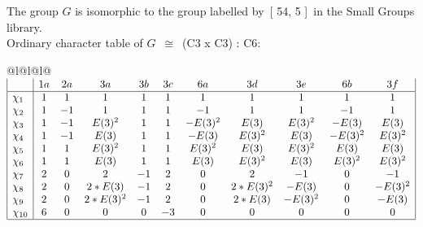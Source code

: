 \documentclass[varwidth=\maxdimen,border=10]{standalone}
\begin{document}
The group $G$ is isomorphic to the group labelled by\ [ 54, 5 ]\ in the Small Groups library.\\
Ordinary character table of $G$\ $\cong$\ (C3 x C3) : C6:\\
\begin{center}
\begin{tabular}{@{}l@{}l@{}l@{}}
\hline
\(\begin{array}{|l|cccccccccc|}
  & 1a & 2a & 3a & 3b & 3c & 6a & 3d & 3e & 6b & 3f\\ \hline
\chi_{1} & 1 & 1 & 1 & 1 & 1 & 1 & 1 & 1 & 1 & 1\\
\chi_{2} & 1 & -1 & 1 & 1 & 1 & -1 & 1 & 1 & -1 & 1\\
\chi_{3} & 1 & -1 & E(3)^{2} & 1 & 1 & -E(3)^{2} & E(3) & E(3)^{2} & -E(3) & E(3)\\
\chi_{4} & 1 & -1 & E(3) & 1 & 1 & -E(3) & E(3)^{2} & E(3) & -E(3)^{2} & E(3)^{2}\\
\chi_{5} & 1 & 1 & E(3)^{2} & 1 & 1 & E(3)^{2} & E(3) & E(3)^{2} & E(3) & E(3)\\
\chi_{6} & 1 & 1 & E(3) & 1 & 1 & E(3) & E(3)^{2} & E(3) & E(3)^{2} & E(3)^{2}\\
\chi_{7} & 2 & 0 & 2 & -1 & 2 & 0 & 2 & -1 & 0 & -1\\
\chi_{8} & 2 & 0 & 2*E(3) & -1 & 2 & 0 & 2*E(3)^{2} & -E(3) & 0 & -E(3)^{2}\\
\chi_{9} & 2 & 0 & 2*E(3)^{2} & -1 & 2 & 0 & 2*E(3) & -E(3)^{2} & 0 & -E(3)\\
\chi_{10} & 6 & 0 & 0 & 0 & -3 & 0 & 0 & 0 & 0 & 0\\
\hline
\end{array}\)\\
\end{tabular}
\end{center}
\end{document}

